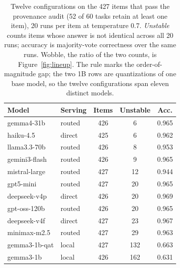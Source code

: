 \begin{table}[t]
\centering
\scriptsize
\setlength{\tabcolsep}{3pt}
\begin{tabular}{l l S[table-format=3.0] S[table-format=3.0] S[table-format=1.3]}
\toprule
Model & Serving & {Items} & {Unstable} & {Acc.} \\
\midrule
gemma4-31b & routed & 426 & 6 & 0.965 \\
haiku-4.5 & direct & 425 & 6 & 0.962 \\
llama3.3-70b & routed & 426 & 8 & 0.953 \\
gemini3-flash & routed & 426 & 9 & 0.965 \\
mistral-large & routed & 427 & 12 & 0.944 \\
gpt5-mini & routed & 427 & 20 & 0.965 \\
deepseek-v4p & direct & 426 & 20 & 0.969 \\
gpt-oss-120b & routed & 426 & 20 & 0.965 \\
deepseek-v4f & direct & 427 & 23 & 0.967 \\
minimax-m2.5 & routed & 427 & 29 & 0.963 \\
\midrule
gemma3-1b-qat & local & 427 & 132 & 0.663 \\
gemma3-1b & local & 426 & 162 & 0.631 \\
\bottomrule
\end{tabular}
\caption{Twelve configurations on the 427 items that pass the provenance audit (52 of 60 tasks retain at least one item), 20 runs per item at temperature 0.7. \emph{Unstable} counts items whose answer is not identical across all 20 runs; accuracy is majority-vote correctness over the same runs. Wobble, the ratio of the two counts, is Figure~\ref{fig:lineup}. The rule marks the order-of-magnitude gap; the two 1B rows are quantizations of one base model, so the twelve configurations span eleven distinct models.}
\label{tab:lineup}
\end{table}
